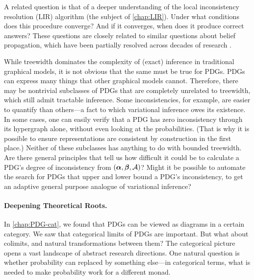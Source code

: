 A related question is that of a deeper understanding of the local inconsistency resolution (LIR) algorithm (the subject of \cref{chap:LIR}). 
Under what conditions does this procedure converge?
And if it converges, when does it produce correct answers?
These questions are closely related to similar questions about belief propagation, which have been partially resolved across decades of research
\citep{}.


While treewidth dominates the complexity of (exact) inference in traditional graphical models, it is not obvious that the same must be true for PDGs. 
PDGs can express many things that other graphical models cannot. 
Therefore, there may be nontrivial subclasses of PDGs that are completely unrelated to treewidth, which still admit tractable inference. 
%
Some inconsistencies, for example, are easier to quantify than others---a fact to which variational inference owes its existence. 
In some cases, one can easily verify that a PDG has zero inconsistency through its hypergraph alone, without even looking at the probabilities.
(That is why it is possible to ensure representations are consistent by construction in the first place.)
Neither of these subclasses has anything to do with bounded treewidth. 
Are there general principles that tell us how difficult it could be to calculate a PDG's degree of inconsistency from $(\boldsymbol\alpha,\boldsymbol\beta,\mathcal A)$?
Might it be possible to automate the 
    search for PDGs that upper and lower bound a PDG's inconsistency,
    to get an adaptive general purpose analogue of variational inference?
    
\paragraph{Deepening Theoretical Roots.}
% 
In \cref{chap:PDG-cat}, we found that PDGs can be viewed as diagrams in a certain category. 
We saw that categorical limits of PDGs are important. But what about colimits, and natural transformations between them? 
The categorical picture opens a vast landscape of abstract research directions.
One natural question is whether probability can replaced by something else---in categorical terms, what is needed to make probability work for a different monad.

